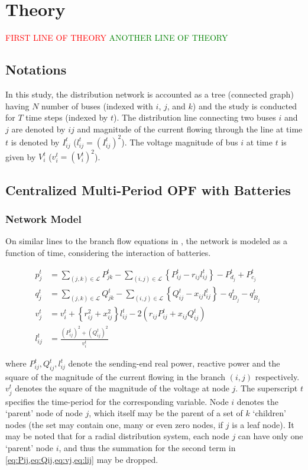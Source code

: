 \documentclass{article}
\begin{document}
\section{Theory}
\textcolor{red}{FIRST LINE OF THEORY}
\textcolor{green}{ANOTHER LINE OF THEORY}

\subsection{Notations}
In this study, the distribution network is accounted as a tree (connected graph) having \(N\) number of buses (indexed with \(i\), \(j\), and \(k\)) and the study is conducted for \(T\) time steps (indexed by \(t\)). The distribution line connecting two buses \(i\) and \(j\) are denoted by {\(ij\)} and magnitude of the current flowing through the line at time \(t\) is denoted by \(I_{ij}^t\) (\(l_{ij}^t=\left(I_{ij}^t\right)^2\)). The voltage magnitude of bus \(i\) at time \(t\) is given by \(V_i^t\) (\(v_i^t=\left(V_i^t\right)^2\)). 

\subsection{Centralized Multi-Period OPF with Batteries}

\subsubsection{Network Model}

On similar lines to the branch flow equations in \cite{bfm01}, the network is modeled as a function of time, considering the interaction of batteries.

\begin{align}
    {p_j^t} & = {\sum_{(j, k) \in \mathcal{L}} P_{jk}^t - \sum_{(i, j) \in \mathcal{L}}\left\{P_{ij}^t - r_{ij}l_{ij}^t\right\} - P_{d_j}^t + P_{c_j}^t} && \label{eq:Pij} \\ 
    {q_j^t} & = {\sum_{(j, k) \in \mathcal{L}} Q_{jk}^t - \sum_{(i, j) \in \mathcal{L}}\left\{Q_{ij}^t - x_{ij}l_{ij}^t\right\} - q_{D_j}^t - q_{B_j}^t} && \label{eq:Qij} \\ 
    {v_j^t} & = {v_{i}^t +  \left\{r_{ij}^2 + x_{ij}^2\right\}l_{ij}^t - 2(r_{ij}P_{ij}^t + x_{ij}Q_{ij}^t)} \label{eq:vj} && \\
    {l_{ij}^t} & = {\frac{(P_{ij}^{t})^2 + (Q_{ij}^{t})^2}{v_i^t}} \label{eq:lij}
\end{align}

where $P^{t}_{ij}, Q^{t}_{ij}, l^{t}_{ij}$ denote the sending-end real power, reactive power and the square of the magnitude of the current flowing in the branch $(i, j)$ respectively. $v^{t}_{j}$ denotes the square of the magnitude of the voltage at node $j$. The superscript $t$ specifies the time-period for the corresponding variable. Node $i$ denotes the `parent' node of node $j$, which itself may be the parent of a set of $k$ `children' nodes (the set may contain one, many or even zero nodes, if $j$ is a leaf node). It may be noted that for a radial distribution system, each node $j$ can have only one `parent' node $i$, and thus the summation for the second term in  \cref{eq:Pij,eq:Qij,eq:vj,eq:lij} may be dropped.
\end{document}
